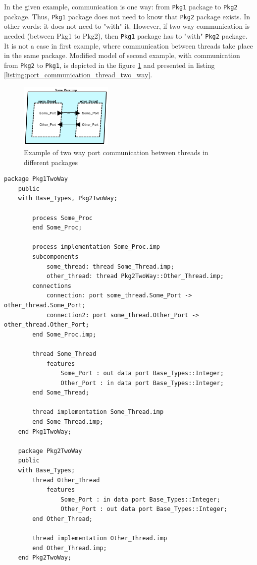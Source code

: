 In the given example, communication is one way: from \lstinline{Pkg1} package to \lstinline{Pkg2} package. Thus, \lstinline{Pkg1} package does not need to know that \lstinline{Pkg2} package exists. In other words: it does not need to "with" it. However, if two way communication is needed (between Pkg1 to Pkg2), then \lstinline{Pkg1} package has to "with" \lstinline{Pkg2} package. It is not a case in first example, where communication between threads take place in the same package. Modified model of second example, with communication from \lstinline{Pkg2} to \lstinline{Pkg1}, is depicted in the figure \ref{figure:port_communication_thread_two_way} and presented in listing \ref{listing:port_communication_thread_two_way}. 

\begin{figure}[ht]%
    \begin{center}
    	\includegraphics[width=0.4\textwidth]{figures/port-communication-thread-two-way.png}
    	\caption{Example of two way port communication between threads in different packages}
    \end{center}
    \label{figure:port_communication_thread_two_way}
\end{figure}

\singlespacing
\begin{lstlisting}[language=aadl, frame=single, gobble=0, caption={AADL model of two way port communication threads in different packages}, label={listing:port_communication_thread_two_way}]
	package Pkg1TwoWay
	public
	with Base_Types, Pkg2TwoWay;

		process Some_Proc
		end Some_Proc;
		
		process implementation Some_Proc.imp
		subcomponents
			some_thread: thread Some_Thread.imp;
			other_thread: thread Pkg2TwoWay::Other_Thread.imp;
		connections
			connection: port some_thread.Some_Port -> other_thread.Some_Port;
			connection2: port some_thread.Other_Port -> other_thread.Other_Port;
		end Some_Proc.imp;

		thread Some_Thread
			features
				Some_Port : out data port Base_Types::Integer;
				Other_Port : in data port Base_Types::Integer;
		end Some_Thread;

		thread implementation Some_Thread.imp
		end Some_Thread.imp;	
	end Pkg1TwoWay;

	package Pkg2TwoWay
	public
	with Base_Types;
		thread Other_Thread
			features
				Some_Port : in data port Base_Types::Integer;
				Other_Port : out data port Base_Types::Integer;
		end Other_Thread;

		thread implementation Other_Thread.imp
		end Other_Thread.imp;
	end Pkg2TwoWay;
\end{lstlisting} 
\doublespacing

